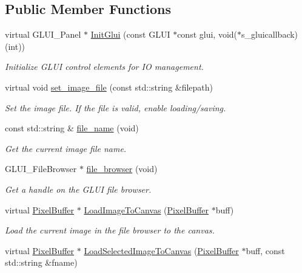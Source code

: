 \subsection*{Public Member Functions}
\begin{DoxyCompactItemize}
\item 
virtual G\+L\+U\+I\+\_\+\+Panel $\ast$ \hyperlink{classimage__tools_1_1IOManager_a5038100a2a640a3343c4715101eec120}{Init\+Glui} (const G\+L\+UI $\ast$const glui, void($\ast$s\+\_\+gluicallback)(int))
\begin{DoxyCompactList}\small\item\em Initialize G\+L\+UI control elements for IO management. \end{DoxyCompactList}\item 
virtual void \hyperlink{classimage__tools_1_1IOManager_a9ddac98843256d25442aba6c963e144a}{set\+\_\+image\+\_\+file} (const std\+::string \&filepath)
\begin{DoxyCompactList}\small\item\em Set the image file. If the file is valid, enable loading/saving. \end{DoxyCompactList}\item 
const std\+::string \& \hyperlink{classimage__tools_1_1IOManager_a667da573afc3fc0977408a0bf669f448}{file\+\_\+name} (void)
\begin{DoxyCompactList}\small\item\em Get the current image file name. \end{DoxyCompactList}\item 
G\+L\+U\+I\+\_\+\+File\+Browser $\ast$ \hyperlink{classimage__tools_1_1IOManager_ab58911faeeb831cc1f62aec390718469}{file\+\_\+browser} (void)
\begin{DoxyCompactList}\small\item\em Get a handle on the G\+L\+UI file browser. \end{DoxyCompactList}\item 
virtual \hyperlink{classimage__tools_1_1PixelBuffer}{Pixel\+Buffer} $\ast$ \hyperlink{classimage__tools_1_1IOManager_a20f5ccaeafbeb5e0ef7671dc2b61ce8c}{Load\+Image\+To\+Canvas} (\hyperlink{classimage__tools_1_1PixelBuffer}{Pixel\+Buffer} $\ast$buff)\hypertarget{classimage__tools_1_1IOManager_a20f5ccaeafbeb5e0ef7671dc2b61ce8c}{}\label{classimage__tools_1_1IOManager_a20f5ccaeafbeb5e0ef7671dc2b61ce8c}

\begin{DoxyCompactList}\small\item\em Load the current image in the file browser to the canvas. \end{DoxyCompactList}\item 
virtual \hyperlink{classimage__tools_1_1PixelBuffer}{Pixel\+Buffer} $\ast$ \hyperlink{classimage__tools_1_1IOManager_a60acc367c91d9349b35f7f846d569418}{Load\+Selected\+Image\+To\+Canvas} (\hyperlink{classimage__tools_1_1PixelBuffer}{Pixel\+Buffer} $\ast$buff, const std\+::string \&fname)\hypertarget{classimage__tools_1_1IOManager_a60acc367c91d9349b35f7f846d569418}{}\label{classimage__tools_1_1IOManager_a60acc367c91d9349b35f7f846d569418}


\end{DoxyCompactItemize}
